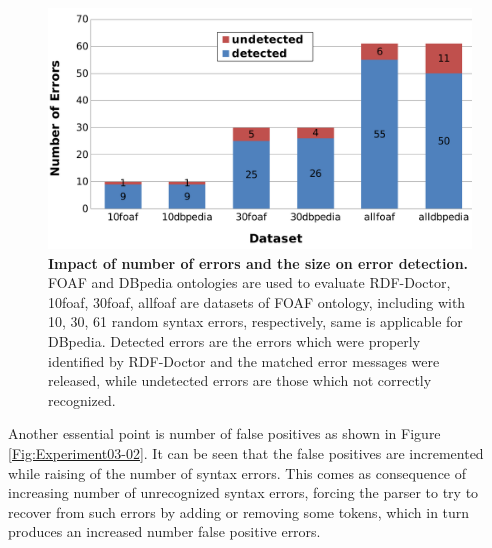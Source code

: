 \begin{figure}[ht]
\begin{center}
		\includegraphics[scale=0.3,angle=0]{images/Experiment03-01.png}
				\setlength\belowcaptionskip{-5mm}
		\caption{\textbf{Impact of number of errors and the size on error detection.} 
		FOAF and DBpedia ontologies are used to evaluate RDF-Doctor, 10foaf, 30foaf, allfoaf are datasets of FOAF ontology, including with 10, 30, 61 random syntax errors, respectively, same is applicable for DBpedia. Detected errors are the errors which were properly identified by RDF-Doctor and the matched error messages were released, while undetected errors are those which not correctly recognized.}
		\label{Fig:Experiment03-01}

\end{center}
\end{figure}


Another essential point is number of false positives as shown in Figure \ref{Fig:Experiment03-02}. 
It can be seen that the false positives are incremented while raising of the number of syntax errors.
This comes as consequence of increasing number of unrecognized syntax errors, forcing the parser to try to recover from such errors by adding or removing some tokens, which in turn produces an increased number false positive errors.   

